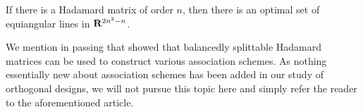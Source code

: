 \documentclass[../../../main]{subfiles}
\begin{document}
\begin{cor}\label{optimal-lines-cor}
 If there is a Hadamard matrix of order $n$, then there is an optimal set of equiangular lines in $\mathbf{R}^{2n^2-n}$.
\end{cor}
 
 We mention in passing that \cite{splittable-hadamard} showed that balancedly splittable Hadamard matrices can be used to construct various association schemes. As nothing essentially new about association schemes has been added in our study of orthogonal designs, we will not pursue this topic here and simply refer the reader to the aforementioned article.
 
\biblio
\end{document}
